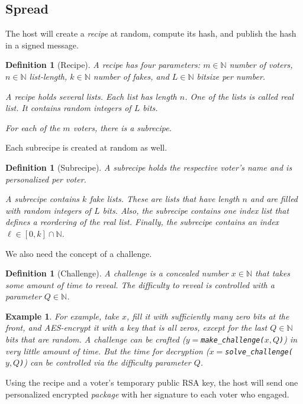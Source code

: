 \documentclass{article}
\newcommand{\N}{\mathbb{N}\xspace}
\newtheorem{xpl}[thm]{Example}
\newtheorem{defn}[thm]{Definition}
\theoremstyle{definition}
\begin{document}
	\subsection{Spread}
	The host will create a \emph{recipe} at random, compute its hash, and publish the hash in a signed message.
	
	\begin{defn}[Recipe]
		A recipe has four parameters: $m \in \N$ number of voters, $n \in \N$ list-length, $k \in \N$ number of fakes, and $L \in \N$ bitsize per number.
		
		A recipe holds several lists. Each list has length $n$. One of the lists is called \emph{real list}. It contains random integers of $L$ bits. 
		
		For each of the $m$ voters, there is a subrecipe.
	\end{defn}
	Each subrecipe is created at random as well.
	
	\begin{defn}[Subrecipe]
		A subrecipe holds the respective voter's name and is personalized per voter.
		
		A subrecipe contains $k$ fake lists. These are lists that have length $n$ and are filled with random integers of $L$ bits. Also, the subrecipe contains one \emph{index list} that defines a reordering of the real list. Finally, the subrecipe contains an index $\ell \in [0,k] \cap \N$.
	\end{defn}
	
	We also need the concept of a challenge.
	\begin{defn}[Challenge]
		A challenge is a concealed number $x \in\N$ that takes some amount of time to reveal. The difficulty to reveal is controlled with a parameter $Q \in \N$.
	\end{defn}
	
	\begin{xpl}
		 For example, take $x$, fill it with sufficiently many zero bits at the front, and AES-encrypt it with a key that is all zeros, except for the last $Q \in \N$ bits that are random. A challenge can be crafted ($y=$\texttt{make\_challenge($x,Q$)}) in very little amount of time. But the time for decryption ($x=$\texttt{solve\_challenge($y,Q$)}) can be controlled via the difficulty parameter $Q$.
	\end{xpl}
	
	Using the recipe and a voter's temporary public RSA key, the host will send one personalized encrypted \emph{package} with her signature to each voter who engaged.
	
\end{document}
